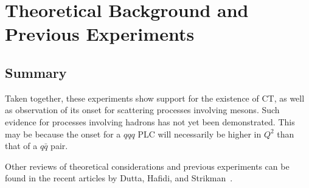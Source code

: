 \chapter{Theoretical Background and Previous Experiments}





\section{Summary}
Taken together, these experiments show support for the existence of CT, as well
as observation of its onset for scattering processes involving mesons.
Such evidence for processes involving hadrons has not yet been demonstrated.
This may be because the onset for a $qqq$ PLC will necessarily be higher in
$Q^2$ than that of a $q\bar{q}$ pair.

Other reviews of theoretical considerations and previous experiments can be found in
the recent articles by Dutta, Hafidi, and Strikman~\cite{Dutta_2013,Dutta_2012}.
